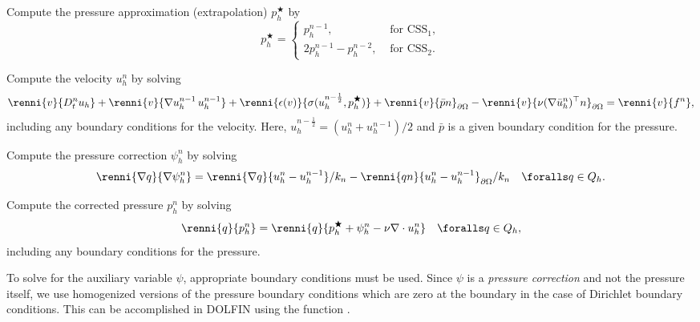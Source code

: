 {
\item
  Compute the pressure approximation (extrapolation)
  $p_h^{\bigstar}$ by
  \begin{equation}\label{eq:css,1a}
    p_h^{\bigstar} =
    \left\{
    \begin{array}{ll}
      p_h^{n-1}, & \mbox{ for } \mathrm{CSS}_1, \\
      2 p_h^{n-1} - p_h^{n-2}, & \mbox{ for } \mathrm{CSS}_2.
    \end{array}
    \right.
  \end{equation}

\item
  Compute the velocity $u_h^n$ by solving
  \begin{equation}\label{eq:css,2}
    \begin{split}
      \renni{v}{D_t^n u_h}
      + \renni{v}{\nabla u_h^{n-1} \, u_h^{n-1}}
      + \renni{\epsilon(v)}{\sigma(u^{n-\frac{1}{2}}_h, p_h^{\bigstar})}
      + \renni{v}{\bar{p} n}_{\partial\Omega}
      - \renni{v}{\nu (\nabla \bar{u}_h^n)^{\top} n}_{\partial\Omega}
      = \renni{v}{f^n},
    \end{split}
  \end{equation}
  including any boundary conditions for the velocity. Here,
  $u^{n-\frac{1}{2}}_h = (u_h^n + u_h^{n-1}) / 2$ and $\bar{p}$ is a given
  boundary condition for the pressure.

\item
  Compute the pressure correction $\psi_h^n$ by solving
  \begin{equation}\label{eq:css,3}
    \renni{\nabla q}{\nabla \psi_h^n}
    = \renni{\nabla q}{u_h^n - u_h^{n-1}} / k_n
    - \renni{qn}{u_h^n - u_h^{n-1}}_{\partial\Omega} / k_n
    \quad \foralls q \in Q_h.
  \end{equation}

\item
  Compute the corrected pressure $p_h^n$ by solving
  \begin{equation}\label{eq:css,4}
    \renni{q}{p_h^n} = \renni{q}{p_h^{\bigstar} + \psi_h^n - \nu \nabla \cdot u_h^n}
    \quad \foralls q \in Q_h,
  \end{equation}
  including any boundary conditions for the pressure.
}

To solve for the auxiliary variable $\psi$, appropriate boundary
conditions must be used. Since $\psi$ is a \emph{pressure correction}
and not the pressure itself, we use homogenized versions of the
pressure boundary conditions which are zero at the boundary in the
case of Dirichlet boundary conditions. This can be accomplished in
DOLFIN using the function .


